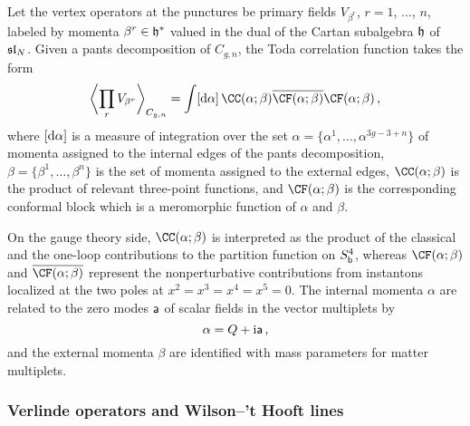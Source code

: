 Let the vertex operators at the punctures be primary fields
$V_{\beta^r}$, $r = 1$, $\dotsc$, $n$, labeled by momenta
$\beta^r \in \mathfrak{h}^*$ valued in the dual of the Cartan subalgebra $\mathfrak{h}$
of $\mathfrak{sl}_N$.  Given a pants decomposition of $C_{g,n}$, the Toda
correlation function takes the form
\begin{equation}
  \biggvev{\prod_r V_{\beta^r}}_{C_{g,n}}
  =
  \int [\rmd\alpha] \,
  \CC(\alpha; \beta)
  \overline{\CF(\alpha; \beta)} \CF(\alpha; \beta) \,,
\end{equation}
where $[\mathrm{d}\alpha]$ is a measure of integration over the set
$\alpha = \{\alpha^1, \dotsc, \alpha^{3g - 3 + n}\}$ of momenta
assigned to the internal edges of the pants decomposition,
$\beta = \{\beta^1, \dotsc, \beta^n\}$ is the set of momenta assigned
to the external edges, $\CC(\alpha; \beta)$ is the product of relevant
three-point functions, and $\CF(\alpha; \beta)$ is the corresponding
conformal block which is a meromorphic function of $\alpha$ and
$\beta$.

On the gauge theory side, $\CC(\alpha; \beta)$ is interpreted as the
product of the classical and the one-loop contributions to the
partition function on $S^4_{\mathsf{b}}$, whereas $\CF(\alpha; \beta)$ and
$\overline{\CF(\alpha; \beta)}$ represent the nonperturbative
contributions from instantons localized at the two poles at
$x^2 = x^3 = x^4 = x^5 = 0$.  The internal momenta $\alpha$ are
related to the zero modes $\mathsf{a}$ of scalar fields in the vector
multiplets by
\begin{equation}
  \alpha = Q + \mathrm{i}\mathsf{a} \,,
\end{equation}
and the external momenta $\beta$ are identified with mass parameters
for matter multiplets.






\subsubsection{Verlinde operators and Wilson--'t Hooft lines}

